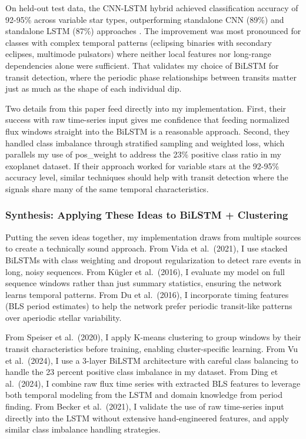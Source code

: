 \documentclass[letterpaper]{article} %
\begin{document}
On held-out test data, the CNN-LSTM hybrid achieved classification accuracy of 92-95\% across variable star types, outperforming standalone CNN (89\%) and standalone LSTM (87\%) approaches \cite{Becker2021variablestars}. The improvement was most pronounced for classes with complex temporal patterns (eclipsing binaries with secondary eclipses, multimode pulsators) where neither local features nor long-range dependencies alone were sufficient. That validates my choice of BiLSTM for transit detection, where the periodic phase relationships between transits matter just as much as the shape of each individual dip.

Two details from this paper feed directly into my implementation. First, their success with raw time-series input gives me confidence that feeding normalized flux windows straight into the BiLSTM is a reasonable approach. Second, they handled class imbalance through stratified sampling and weighted loss, which parallels my use of pos\_weight to address the 23\% positive class ratio in my exoplanet dataset. If their approach worked for variable stars at the 92-95\% accuracy level, similar techniques should help with transit detection where the signals share many of the same temporal characteristics.

\subsubsection{Synthesis: Applying These Ideas to BiLSTM + Clustering}

Putting the seven ideas together, my implementation draws from multiple sources to create a technically sound approach. From Vida et al.\ (2021), I use stacked BiLSTMs with class weighting and dropout regularization to detect rare events in long, noisy sequences. From Kügler et al.\ (2016), I evaluate my model on full sequence windows rather than just summary statistics, ensuring the network learns temporal patterns. From Du et al.\ (2016), I incorporate timing features (BLS period estimates) to help the network prefer periodic transit-like patterns over aperiodic stellar variability.

From Speiser et al.\ (2020), I apply K-means clustering to group windows by their transit characteristics before training, enabling cluster-specific learning. From Vu et al.\ (2024), I use a 3-layer BiLSTM architecture with careful class balancing to handle the 23 percent positive class imbalance in my dataset. From Ding et al.\ (2024), I combine raw flux time series with extracted BLS features to leverage both temporal modeling from the LSTM and domain knowledge from period finding. From Becker et al.\ (2021), I validate the use of raw time-series input directly into the LSTM without extensive hand-engineered features, and apply similar class imbalance handling strategies.
\end{document}
